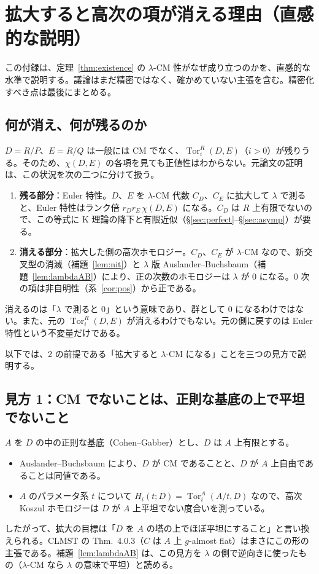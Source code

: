 \documentclass[11pt,a4paper]{ltjsarticle}
\numberwithin{equation}{section}
\theoremstyle{plain}
\theoremstyle{definition}
\theoremstyle{definition}
\newcommand{\Tor}{\operatorname{Tor}}
\begin{document}
\section{拡大すると高次の項が消える理由（直感的な説明）}\label{sec:intuition}

この付録は、定理~\ref{thm:existence} の $\lambda$-CM 性がなぜ成り立つのかを、直感的な水準で説明する。議論はまだ精密ではなく、確かめていない主張を含む。精密化すべき点は最後にまとめる。

\subsection{何が消え、何が残るのか}

$D = R/P$、$E = R/Q$ は一般には CM でなく、$\Tor_i^R(D,E)$（$i>0$）が残りうる。そのため、$\chi(D,E)$ の各項を見ても正値性はわからない。元論文の証明は、この状況を次の二つに分けて扱う。
\begin{enumerate}
  \item \textbf{残る部分}：Euler 特性。$D$、$E$ を $\lambda$-CM 代数 $C_D$、$C_E$ に拡大して $\lambda$ で測ると、Euler 特性はランク倍 $r_D r_E\,\chi(D,E)$ になる。$C_D$ は $R$ 上有限でないので、この等式に K 理論の降下と有限近似（§\ref{sec:perfect}--§\ref{sec:asymp}）が要る。
  \item \textbf{消える部分}：拡大した側の高次ホモロジー。$C_D$、$C_E$ が $\lambda$-CM なので、新交叉型の消滅（補題~\ref{lem:nit}）と $\lambda$ 版 Auslander--Buchsbaum（補題~\ref{lem:lambdaAB}）により、正の次数のホモロジーは $\lambda$ が $0$ になる。$0$ 次の項は非自明性（系~\ref{cor:pos}）から正である。
\end{enumerate}
消えるのは「$\lambda$ で測ると $0$」という意味であり、群として $0$ になるわけではない。また、元の $\Tor_i^R(D,E)$ が消えるわけでもない。元の側に戻すのは Euler 特性という不変量だけである。

以下では、2 の前提である「拡大すると $\lambda$-CM になる」ことを三つの見方で説明する。

\subsection{見方 1：CM でないことは、正則な基底の上で平坦でないこと}

$A$ を $D$ の中の正則な基底（Cohen--Gabber）とし、$D$ は $A$ 上有限とする。
\begin{itemize}
  \item Auslander--Buchsbaum により、$D$ が CM であることと、$D$ が $A$ 上自由であることは同値である。
  \item $A$ のパラメータ系 $t$ について $H_i(t;D) = \Tor^A_i(A/t, D)$ なので、高次 Koszul ホモロジーは $D$ が $A$ 上平坦でない度合いを測っている。
\end{itemize}
したがって、拡大の目標は「$D$ を $A$ の塔の上でほぼ平坦にすること」と言い換えられる。CLMST の Thm.~4.0.3（$C$ は $A$ 上 $g$-almost flat）はまさにこの形の主張である。補題~\ref{lem:lambdaAB} は、この見方を $\lambda$ の側で逆向きに使ったもの（$\lambda$-CM なら $\lambda$ の意味で平坦）と読める。
\end{document}
